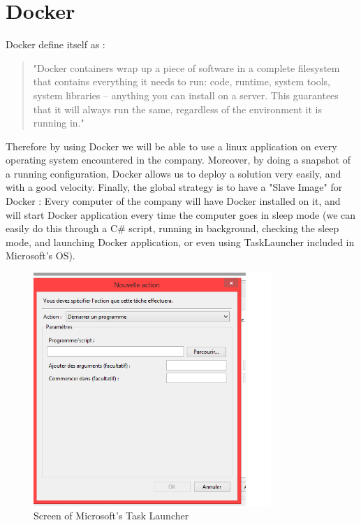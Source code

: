 \documentclass[11pt]{report} %
\begin{document}
\section{Docker}
Docker define itself as : \begin{quote}"Docker containers wrap up a piece of software in a complete filesystem that contains everything it needs to run: code, runtime, system tools, system libraries – anything you can install on a server. This guarantees that it will always run the same, regardless of the environment it is running in."\end{quote}

Therefore by using Docker we will be able to use a linux application on every operating system encountered in the company.
Moreover, by doing a snapshot of a running configuration, Docker allows us to deploy a solution very easily, and with a good velocity.
Finally, the global strategy is to have a "Slave Image" for Docker : 
Every computer of the company will have Docker installed on it, and will start Docker application every time the computer goes in sleep mode (we can easily do this through a C\# script, running in background, checking the sleep mode, and launching Docker application, or even using TaskLauncher included in Microsoft's OS).
\begin{figure}[ht!]
\centering
\includegraphics[width=90mm]{screen.png}
\caption{Screen of Microsoft's Task Launcher \label{overflow}}
\end{figure}
\end{document}
